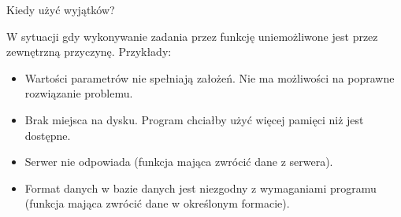 \documentclass[notheorems, aspectratio=54]{beamer}
\begin{document}
\begin{frame}
	
	Kiedy użyć wyjątków?
	
	W sytuacji gdy wykonywanie zadania przez funkcję uniemożliwone jest przez zewnętrzną przyczynę. Przykłady:
	
	\begin{itemize}
		\item Wartości parametrów nie spełniają założeń. Nie ma możliwości na poprawne rozwiązanie problemu.
		\item Brak miejsca na dysku. Program chciałby użyć więcej pamięci niż jest dostępne.
		\item Serwer nie odpowiada (funkcja mająca zwrócić dane z serwera).
		\item Format danych w bazie danych jest niezgodny z wymaganiami programu (funkcja mająca zwrócić dane w określonym formacie).
	\end{itemize}
	
\end{frame}
\end{document}
